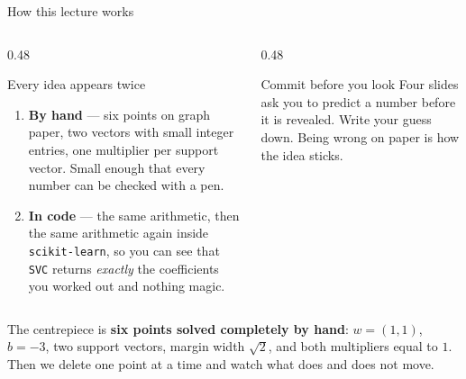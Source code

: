 \documentclass[aspectratio=169]{beamer}
\begin{document}
\begin{frame}[shrink=8]{How this lecture works}
  \begin{columns}[T]
    \begin{column}{0.48\textwidth}
      \begin{block}{Every idea appears twice}
        \begin{enumerate}
          \item \textbf{By hand} --- six points on graph paper, two vectors
            with small integer entries, one multiplier per support vector.
            Small enough that every number can be checked with a pen.
          \item \textbf{In code} --- the same arithmetic, then the same
            arithmetic again inside \texttt{scikit-learn}, so you can see
            that \texttt{SVC} returns \emph{exactly} the coefficients you
            worked out and nothing magic.
        \end{enumerate}
      \end{block}
    \end{column}
    \begin{column}{0.48\textwidth}
      \begin{alertblock}{Commit before you look}
        Four slides ask you to predict a number before it is revealed. Write
        your guess down. Being wrong on paper is how the idea sticks.
      \end{alertblock}
    \end{column}
  \end{columns}
  \vspace{0.3em}
  \begin{center}
    \small The centrepiece is \textbf{six points solved completely by hand}:
    $w = (1,1)$, $b = -3$, two support vectors, margin width $\sqrt2$, and
    both multipliers equal to $1$. Then we delete one point at a time and
    watch what does and does not move.
  \end{center}
\end{frame}
\end{document}
